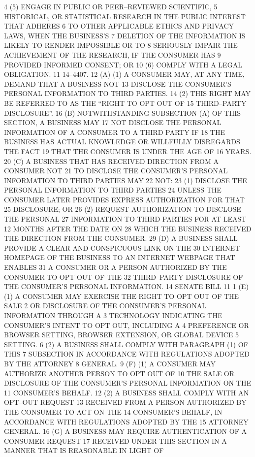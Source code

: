 4 (5) ENGAGE IN PUBLIC OR PEER–REVIEWED SCIENTIFIC,
5 HISTORICAL, OR STATISTICAL RESEARCH IN THE PUBLIC INTEREST THAT ADHERES
6 TO OTHER APPLICABLE ETHICS AND PRIVACY LAWS, WHEN THE BUSINESS’S
7 DELETION OF THE INFORMATION IS LIKELY TO RENDER IMPOSSIBLE OR TO
8 SERIOUSLY IMPAIR THE ACHIEVEMENT OF THE RESEARCH, IF THE CONSUMER HAS
9 PROVIDED INFORMED CONSENT; OR
10 (6) COMPLY WITH A LEGAL OBLIGATION.
11 14–4407.
12 (A) (1) A CONSUMER MAY, AT ANY TIME, DEMAND THAT A BUSINESS NOT
13 DISCLOSE THE CONSUMER’S PERSONAL INFORMATION TO THIRD PARTIES.
14 (2) THIS RIGHT MAY BE REFERRED TO AS THE “RIGHT TO OPT OUT OF
15 THIRD–PARTY DISCLOSURE”.
16 (B) NOTWITHSTANDING SUBSECTION (A) OF THIS SECTION, A BUSINESS MAY
17 NOT DISCLOSE THE PERSONAL INFORMATION OF A CONSUMER TO A THIRD PARTY IF
18 THE BUSINESS HAS ACTUAL KNOWLEDGE OR WILLFULLY DISREGARDS THE FACT
19 THAT THE CONSUMER IS UNDER THE AGE OF 16 YEARS.
20 (C) A BUSINESS THAT HAS RECEIVED DIRECTION FROM A CONSUMER NOT
21 TO DISCLOSE THE CONSUMER’S PERSONAL INFORMATION TO THIRD PARTIES MAY
22 NOT:
23 (1) DISCLOSE THE PERSONAL INFORMATION TO THIRD PARTIES
24 UNLESS THE CONSUMER LATER PROVIDES EXPRESS AUTHORIZATION FOR THAT
25 DISCLOSURE; OR
26 (2) REQUEST AUTHORIZATION TO DISCLOSE THE PERSONAL
27 INFORMATION TO THIRD PARTIES FOR AT LEAST 12 MONTHS AFTER THE DATE ON
28 WHICH THE BUSINESS RECEIVED THE DIRECTION FROM THE CONSUMER.
29 (D) A BUSINESS SHALL PROVIDE A CLEAR AND CONSPICUOUS LINK ON THE
30 INTERNET HOMEPAGE OF THE BUSINESS TO AN INTERNET WEBPAGE THAT ENABLES
31 A CONSUMER OR A PERSON AUTHORIZED BY THE CONSUMER TO OPT OUT OF THE
32 THIRD–PARTY DISCLOSURE OF THE CONSUMER’S PERSONAL INFORMATION.
14 SENATE BILL 11
1 (E) (1) A CONSUMER MAY EXERCISE THE RIGHT TO OPT OUT OF THE SALE
2 OR DISCLOSURE OF THE CONSUMER’S PERSONAL INFORMATION THROUGH A
3 TECHNOLOGY INDICATING THE CONSUMER’S INTENT TO OPT OUT, INCLUDING A
4 PREFERENCE OR BROWSER SETTING, BROWSER EXTENSION, OR GLOBAL DEVICE
5 SETTING.
6 (2) A BUSINESS SHALL COMPLY WITH PARAGRAPH (1) OF THIS
7 SUBSECTION IN ACCORDANCE WITH REGULATIONS ADOPTED BY THE ATTORNEY
8 GENERAL.
9 (F) (1) A CONSUMER MAY AUTHORIZE ANOTHER PERSON TO OPT OUT OF
10 THE SALE OR DISCLOSURE OF THE CONSUMER’S PERSONAL INFORMATION ON THE
11 CONSUMER’S BEHALF.
12 (2) A BUSINESS SHALL COMPLY WITH AN OPT–OUT REQUEST
13 RECEIVED FROM A PERSON AUTHORIZED BY THE CONSUMER TO ACT ON THE
14 CONSUMER’S BEHALF, IN ACCORDANCE WITH REGULATIONS ADOPTED BY THE
15 ATTORNEY GENERAL.
16 (G) A BUSINESS MAY REQUIRE AUTHENTICATION OF A CONSUMER REQUEST
17 RECEIVED UNDER THIS SECTION IN A MANNER THAT IS REASONABLE IN LIGHT OF
